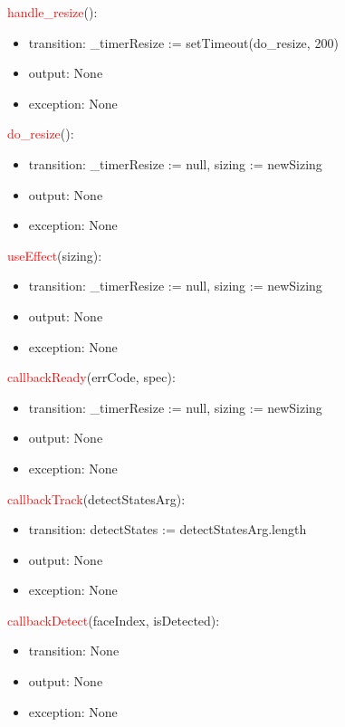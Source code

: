 \documentclass[12pt, titlepage]{article}
\begin{document}
\noindent \textcolor{red}{handle\_resize}():
\begin{itemize}
\item transition: \_timerResize := setTimeout(do\_resize, 200)
\item output: None
\item exception: None
\end{itemize}



\noindent \textcolor{red}{do\_resize}():
\begin{itemize}
\item transition: \_timerResize := null, sizing := newSizing
\item output: None
\item exception: None
\end{itemize}

\noindent \textcolor{red}{useEffect}(sizing):
\begin{itemize}
\item transition: \_timerResize := null, sizing := newSizing
\item output: None
\item exception: None
\end{itemize}

\noindent \textcolor{red}{callbackReady}(errCode, spec):
\begin{itemize}
\item transition: \_timerResize := null, sizing := newSizing
\item output: None
\item exception: None
\end{itemize}

\noindent \textcolor{red}{callbackTrack}(detectStatesArg):
\begin{itemize}
\item transition: detectStates := detectStatesArg.length  
\item output: None
\item exception: None
\end{itemize}

\noindent \textcolor{red}{callbackDetect}(faceIndex, isDetected):
\begin{itemize}
\item transition: None
\item output: None
\item exception: None
\end{itemize}

\newpage
\end{document}
